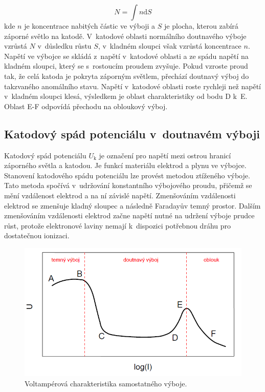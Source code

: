 \documentclass[a4paper,12pt]{article}
\begin{document}
\begin{equation}
	N = \int n \text{d}S
	\label{10}
\end{equation}
kde $n$ je koncentrace nabitých částic ve výboji a $S$ je plocha, kterou zabírá 
záporné světlo na katodě. V~katodové oblasti normálního doutnavého výboje 
vzrůstá $N$ v~důsledku růstu $S$, v~kladném sloupci však vzrůstá koncentrace 
$n$. Napětí ve výbojce se skládá z~napětí v~katodové oblasti a ze spádu napětí 
na kladném sloupci, který se s~rostoucím proudem zvyšuje. Pokud vzroste proud 
tak, že celá katoda je pokryta záporným světlem, přechází doutnavý výboj do 
takzvaného anomálního stavu. Napětí v~katodové oblasti roste rychleji než 
napětí v~kladném sloupci klesá, výsledkem je oblast charakteristiky od bodu D 
k~E. Oblast E-F odpovídá přechodu na obloukový výboj.

\subsection{Katodový spád potenciálu v~doutnavém výboji}
Katodový spád potenciálu $U_\text{k}$ je označení pro napětí mezi ostrou 
hranicí záporného světla a katodou. Je funkcí materiálu elektrod a plynu ve 
výbojce. Stanovení katodového spádu potenciálu lze provést metodou ztíženého 
výboje. 
Tato metoda spočívá v~udržování konstantního výbojového proudu, přičemž se mění 
vzdálenost elektrod a na ní závislé napětí. Zmenšováním vzdálenosti elektrod se 
zmenšuje kladný sloupec a následně Faradayův temný prostor. Dalším 
zmen\-šo\-vá\-ním vzdálenosti elektrod začne napětí nutné na 
udržení výboje prudce růst, protože elektronové laviny nemají k~dispozici 
potřebnou dráhu pro dostatečnou ionizaci.

\begin{figure}[h]
	\centering
	\includegraphics[width=130mm]{VA.png}
	\caption{Voltampérová charakteristika samostatného výboje.}
	\label{VA}
\end{figure}
\end{document}
